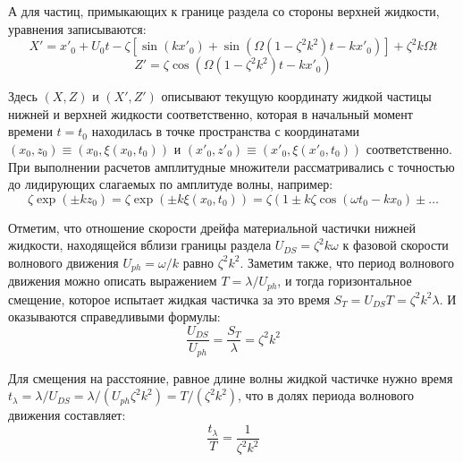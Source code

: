 А для частиц, примыкающих к границе раздела со стороны верхней жидкости, уравнения записываются:
\begin{equation}
X'=x'_{0}+U_{0} t-\zeta \left[ \sin \left( k x'_{0}\right) + \sin \left( \Omega \left( 1-\zeta^{2} k^{2}\right) t- k x'_{0}\right) \right]+\zeta^{2} k \Omega t
\label{X'}
\end{equation}
\begin{equation}
Z'=\zeta  \cos \left( \Omega \left( 1-\zeta^{2} k^{2}\right) t- k x'_{0}\right)
\label{Z'}
\end{equation}

Здесь $ \left( X, Z \right) $ и $ \left( X', Z' \right) $ описывают текущую координату жидкой частицы нижней и верхней жидкости соответственно, которая в начальный момент времени $ t=t_{0} $ находилась в точке пространства с координатами $ \left( x_{0}, z_{0} \right)\equiv \left( x_{0}, \xi \left( x_{0}, t_{0} \right) \right) $ и $ \left( x'_{0}, z'_{0} \right)\equiv \left( x'_{0}, \xi \left( x'_{0}, t_{0} \right) \right) $ соответственно. При выполнении расчетов амплитудные множители рассматривались с точностью до лидирующих слагаемых по амплитуде волны, например:
\begin{equation*}
\zeta \exp \left( \pm k z_{0} \right)= \zeta \exp \left( \pm k  \xi \left( x_{0}, t_{0} \right) \right)= \zeta \left( 1 \pm k \zeta \cos \left( \omega t_{0} - k x_{0} \right) \pm \ldots \right.
\end{equation*}
	 	
Отметим, что отношение скорости дрейфа материальной частички нижней жидкости, находящейся вблизи границы раздела $ U_{DS}=\zeta^{2} k \omega $ к фазовой скорости волнового движения $ U_{ph}=\omega / k $ равно $ \zeta^{2} k^{2} $. Заметим также, что период волнового  движения можно описать выражением $ T=\lambda / U_{ph} $, и тогда горизонтальное смещение, которое испытает жидкая частичка за это время $ S_{T}=U_{DS} T=\zeta^{2} k^{2} \lambda $. И оказываются справедливыми формулы:
\begin{equation*}
\dfrac{U_{DS}}{U_{ph}}=\dfrac{S_{T}}{\lambda}=\zeta^{2} k^{2}
\end{equation*}

Для смещения на расстояние, равное длине волны жидкой частичке нужно время $ t_{\lambda}=\lambda /U_{DS}=\lambda / \left( U_{ph} \zeta^{2} k^{2} \right) =T /  \left( \zeta^{2} k^{2} \right)$, что в долях периода волнового движения составляет:
\begin{equation}
\dfrac{t_{\lambda}}{T}=\dfrac{1}{\zeta^{2} k^{2}}
\label{Period}
\end{equation}

